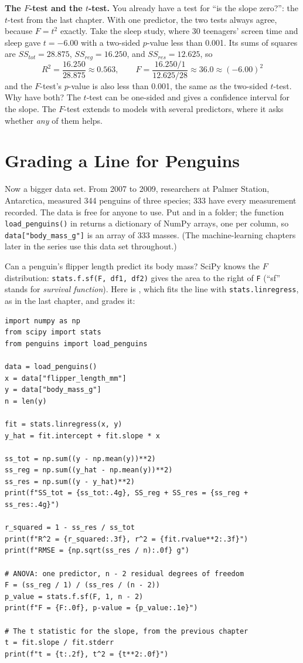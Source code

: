 \textbf{The $F$-test and the $t$-test.} You already have a test for ``is the slope zero?'': the $t$-test from the
last chapter. With one predictor, the two tests always agree, because $F = t^2$ exactly. Take the sleep study,
where 30 teenagers' screen time and sleep gave $t = -6.00$ with a two-sided $p$-value less than 0.001. Its sums of squares
are $SS_{tot} = 28.875$, $SS_{reg} = 16.250$, and $SS_{res} = 12.625$, so
$$R^2 = \frac{16.250}{28.875} \approx 0.563, \qquad F = \frac{16.250/1}{12.625/28} \approx 36.0 \approx (-6.00)^2$$
and the $F$-test's $p$-value is also less than 0.001, the same as the two-sided $t$-test. Why have both? The $t$-test can be
one-sided and gives a confidence interval for the slope. The $F$-test extends to models with several
predictors, where it asks whether \emph{any} of them helps.

\section{Grading a Line for Penguins}
Now a bigger data set. From 2007 to 2009, researchers at Palmer Station, Antarctica, measured 344 penguins of three
species; 333 have every measurement recorded. The data is free for anyone to use. Put  and
 in a folder; the function \verb|load_penguins()| in  returns a
dictionary of NumPy arrays, one per column, so \verb|data["body_mass_g"]| is an array of 333 masses. (The
machine-learning chapters later in the series use this data set throughout.)

Can a penguin's flipper length predict its body mass? SciPy knows the $F$ distribution:
\verb|stats.f.sf(F, df1, df2)| gives the area to the right of \verb|F| (``sf'' stands for \emph{survival
function}). Here is , which fits the line with \verb|stats.linregress|, as in the last
chapter, and grades it:

\begin{verbatim}
import numpy as np
from scipy import stats
from penguins import load_penguins

data = load_penguins()
x = data["flipper_length_mm"]
y = data["body_mass_g"]
n = len(y)

fit = stats.linregress(x, y)
y_hat = fit.intercept + fit.slope * x

ss_tot = np.sum((y - np.mean(y))**2)
ss_reg = np.sum((y_hat - np.mean(y))**2)
ss_res = np.sum((y - y_hat)**2)
print(f"SS_tot = {ss_tot:.4g}, SS_reg + SS_res = {ss_reg + ss_res:.4g}")

r_squared = 1 - ss_res / ss_tot
print(f"R^2 = {r_squared:.3f}, r^2 = {fit.rvalue**2:.3f}")
print(f"RMSE = {np.sqrt(ss_res / n):.0f} g")

# ANOVA: one predictor, n - 2 residual degrees of freedom
F = (ss_reg / 1) / (ss_res / (n - 2))
p_value = stats.f.sf(F, 1, n - 2)
print(f"F = {F:.0f}, p-value = {p_value:.1e}")

# The t statistic for the slope, from the previous chapter
t = fit.slope / fit.stderr
print(f"t = {t:.2f}, t^2 = {t**2:.0f}")
\end{verbatim}

